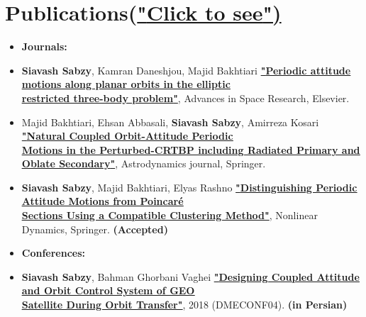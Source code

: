 \documentclass[10pt,a4paper,times]{moderncv}
\begin{document}
\section{Publications(\href{https://scholar.google.com/citations?user=pz4gpScAAAAJ&hl=en}{"\underline{Click to see}")}}
\begin{itemize}

\item\textbf{Journals:}
\item \textbf{Siavash Sabzy}, Kamran Daneshjou, Majid Bakhtiari 
 \textbf{\href{https://doi.org/10.1016/j.asr.2021.01.019}{"\underline{Periodic attitude motions along planar orbits in the elliptic } \\ \underline{restricted three-body problem}"}}, Advances in Space Research, Elsevier.
\item  Majid Bakhtiari, Ehsan Abbasali, \textbf{Siavash Sabzy}, Amirreza Kosari 
 \textbf{\href{https://link.springer.com/article/10.1007/s42064-022-0154-0}{"\underline{Natural Coupled Orbit-Attitude Periodic } \\ \underline{Motions in the Perturbed-CRTBP including Radiated Primary and Oblate Secondary}"}}, Astrodynamics journal, Springer.
\item \textbf{Siavash Sabzy}, Majid Bakhtiari, Elyas Rashno 
 \textbf{\href{ }{"\underline{Distinguishing Periodic Attitude Motions from Poincaré} \\ \underline{Sections Using a Compatible Clustering Method}"}}, Nonlinear Dynamics, Springer. \textbf{(Accepted)} \\


\item\textbf{Conferences:}
\item \textbf{Siavash Sabzy}, Bahman Ghorbani Vaghei
 \textbf{\href{https://civilica.com/doc/881918/}{"\underline{Designing Coupled Attitude and Orbit Control System of GEO} \\ \href{https://civilica.com/doc/881918/}{\underline{Satellite During Orbit Transfer"}}}}, 2018 (DMECONF04). \textbf{(in Persian)}
 

\end{itemize}
\end{document}
